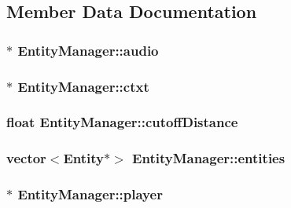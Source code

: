 \subsection{Member Data Documentation}
\hypertarget{class_entity_manager_a4cd55bb8a3aadd05cc78bd301cbd8648}{
\subsubsection[{audio}]{$\ast$ Entity\-Manager\-::audio}}\label{class_entity_manager_a4cd55bb8a3aadd05cc78bd301cbd8648}
\hypertarget{class_entity_manager_aa02de3470b7a14a2dec0f1e81d267222}{
\subsubsection[{ctxt}]{$\ast$ Entity\-Manager\-::ctxt}}\label{class_entity_manager_aa02de3470b7a14a2dec0f1e81d267222}
\hypertarget{class_entity_manager_abbb3c9bdca9545d9cce7b78074dc6be1}{
\subsubsection[{cutoff\-Distance}]{\setlength{\rightskip}{0pt plus 5cm}float Entity\-Manager\-::cutoff\-Distance}}\label{class_entity_manager_abbb3c9bdca9545d9cce7b78074dc6be1}
\hypertarget{class_entity_manager_a13ba63d140c846361a6367139d5b44ce}{
\subsubsection[{entities}]{\setlength{\rightskip}{0pt plus 5cm}vector$<${\bf Entity}$\ast$$>$ Entity\-Manager\-::entities}}\label{class_entity_manager_a13ba63d140c846361a6367139d5b44ce}
\hypertarget{class_entity_manager_a1ef834cba3655b31adffb5ab16589205}{
\subsubsection[{player}]{$\ast$ Entity\-Manager\-::player}}\label{class_entity_manager_a1ef834cba3655b31adffb5ab16589205}
